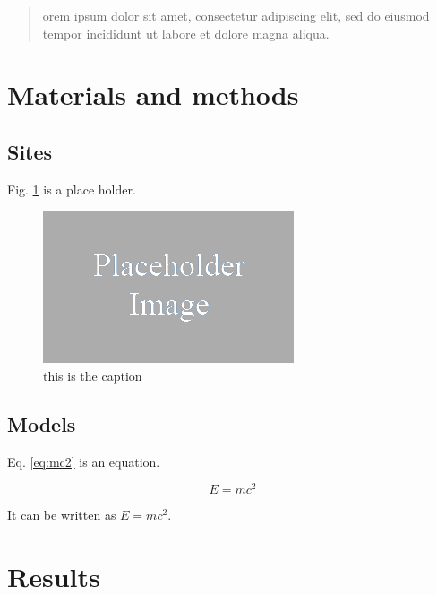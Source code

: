 \documentclass[bgd, online, hvmath]{style/copernicus}
\begin{document}
\begin{quote}
orem ipsum dolor sit amet, consectetur adipiscing elit, sed do eiusmod
tempor incididunt ut labore et dolore magna aliqua.
\end{quote}

\section{Materials and methods}\label{materials-and-methods}

\subsection{Sites}\label{sites}

Fig. \ref{fig:img1} is a place holder.

\begin{figure}

{\centering \includegraphics[width=0.8\linewidth]{images/img} 

}

\caption{this is the caption}\label{fig:img1}
\end{figure}

\subsection{Models}\label{models}

Eq. \eqref{eq:mc2} is an equation.

\begin{equation} 
E = mc^2
  \label{eq:mc2}
\end{equation}

It can be written as \(E = mc^2\).

\section{Results}\label{results}
\end{document}
